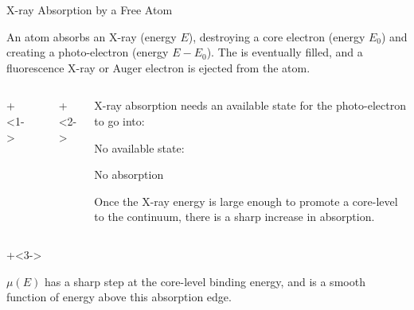 \begin{slide}{X-ray Absorption by a Free Atom}

  \vmm
  \begin{cenpage}{125mm}
    
  \Justify An atom absorbs an X-ray (energy $E$), destroying a core electron (energy
  ${E_0}$) and creating a photo-electron (energy ${E-E_0}$).  The
  {} is eventually filled, and a fluorescence X-ray or Auger
  electron is ejected from the atom.

    \vspace{3mm}

    \begin{columns}[T]
        \onslide+<1->
        \begin{column}{65mm}
        \end{column}

        \onslide+<2->
        \begin{column}{55mm}    \setlength{\baselineskip}{10pt}
          \Justify

        X-ray absorption needs an available state for the
        photo-electron to go into:\par

        \vmm

        \begin{center}
          \begin{postitbox}{28mm}
            No available state:\par No absorption
          \end{postitbox}
          \end{center}
      \vspace{1mm}

      Once the X-ray energy is large enough to promote a core-level to the
      continuum, there is a sharp increase in absorption.

      \end{column}
    \end{columns}

    \vspace{1mm}

    {\onslide+<3->

    \begin{center}
      \begin{postitbox}{80mm}\Justify
        ${\mu(E)}$ has a sharp step at the core-level binding energy, and
        is a smooth function of energy above this absorption edge.
        \par
        \end{postitbox}
     \end{center}
     }

   \end{cenpage}
\end{slide}
